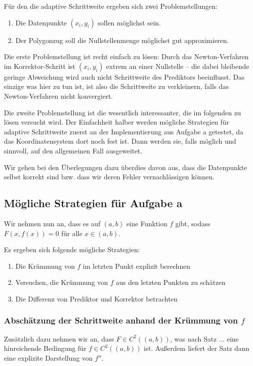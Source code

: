 \documentclass[a4paper,11pt,bibliography=totoc,listof=totoc,headinclude=true,cleardoublepage=empty,oneside]{scrartcl}
\begin{document}
Für den die adaptive Schrittweite ergeben sich zwei Problemstellungen:
\begin{enumerate}
	\item Die Datenpunkte $(x_i,y_i)$ sollen möglichst sein.
	\item Der Polygonzug soll die Nullstellenmenge möglichst gut approximieren.
\end{enumerate}

Die erste Problemstellung ist recht einfach zu lösen: Durch das Newton-Verfahren im Korrektor-Schritt ist $(x_i,y_i)$ extrem an einer Nullstelle -- die dabei bleibende geringe Abweichung wird auch nicht Schrittweite des Prediktors beeinflusst. Das einzige was hier zu tun ist, ist also die Schrittweite zu verkleinern, falls das Newton-Verfahren nicht konvergiert. 

Die zweite Problemstellung ist die wesentlich interessanter, die im folgenden zu lösen versucht wird. Der Einfachheit halber werden mögliche Strategien für adaptive Schrittweite zuerst an der Implementierung aus Aufgabe a getestet, da das Koordinatensystem dort noch fest ist. Dann werden sie, falls möglich und sinnvoll, auf den allgemeinen Fall ausgeweitet.

Wir gehen bei den Überlegungen dazu überdies davon aus, dass die Datenpunkte selbst korrekt sind bzw. dass wir deren Fehler vernachlässigen können.
\subsection{Mögliche Strategien für Aufgabe a}\label{chap:5.1}
Wir nehmen nun an, dass es auf $(a,b)$ eine Funktion $f$ gibt, sodass $F(x,f(x))=0$ für alle $x \in (a,b)$. 

Es ergeben sich folgende mögliche Strategien:
\begin{enumerate}
	\item Die Krümmung von $f$  im letzten Punkt explizit berechnen
	\item Versuchen, die Krümmung von $f$ aus den letzten Punkten zu schätzen 
	\item Die Differenz von Prediktor und Korrektor betrachten
\end{enumerate}


\subsubsection{Abschätzung der Schrittweite anhand der Krümmung von $f$}\label{chap:5.1.1}

 Zusätzlich dazu nehmen wir an, dass $F \in C^2((a,b))$, was nach Satz ... eine hinreichende Bedingung für $f \in C^2((a,b))$ ist. Außerdem liefert der Satz dann eine explizite Darstellung von $f''$.  
\end{document}
